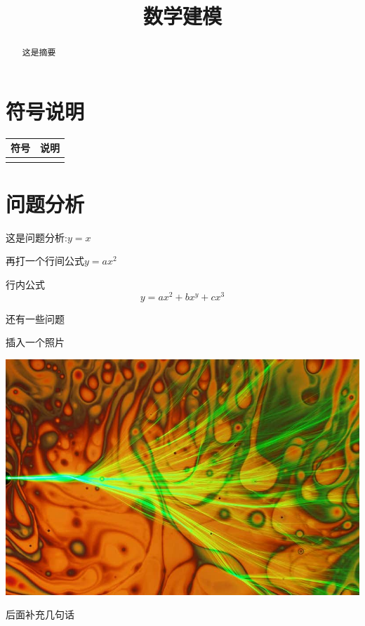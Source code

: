 \documentclass[withoutpreface,bwprint]{cumcmthesis}%
\title{数学建模}%
\begin{document}
%
\normalsize%
\maketitle%
\begin{abstract}%

这是摘要
%
\end{abstract}%
\tableofcontents%

%
\section{符号说明}%
\label{sec:}%
\begin{longtable}{c c }%
\hline%
\hline%
符号&说明\\%
\hline%
\endhead%
\hline%
\endfoot%
\hline%
\hline%
\endlastfoot%
\end{longtable}

%
\section{问题分析}

这是问题分析:$y=x$

再打一个行间公式$y=ax^2$

行内公式
$$
y=ax^2+bx^y+cx^3
$$

还有一些问题

插入一个照片

\includegraphics[None]{1.jpg}

后面补充几句话
%
\end{document}
